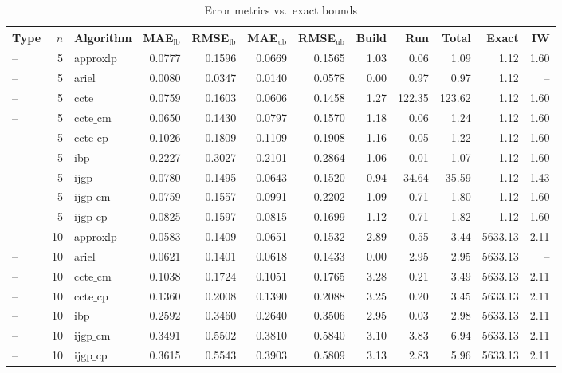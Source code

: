 \begin{table}[ht]
\centering
\scriptsize
\caption{Error metrics vs.\ exact bounds}
\begin{tabular}{lrlrrrrrrrrr}
\toprule
Type & $n$ & Algorithm & MAE$_{\text{lb}}$ & RMSE$_{\text{lb}}$ & MAE$_{\text{ub}}$ & RMSE$_{\text{ub}}$ & Build & Run & Total & Exact & IW \\
\midrule
-- & 5 & approxlp & 0.0777 & 0.1596 & 0.0669 & 0.1565 & 1.03 & 0.06 & 1.09 & 1.12 & 1.60 \\
-- & 5 & ariel & 0.0080 & 0.0347 & 0.0140 & 0.0578 & 0.00 & 0.97 & 0.97 & 1.12 & -- \\
-- & 5 & ccte & 0.0759 & 0.1603 & 0.0606 & 0.1458 & 1.27 & 122.35 & 123.62 & 1.12 & 1.60 \\
-- & 5 & $\text{ccte\_cm}$ & 0.0650 & 0.1430 & 0.0797 & 0.1570 & 1.18 & 0.06 & 1.24 & 1.12 & 1.60 \\
-- & 5 & $\text{ccte\_cp}$ & 0.1026 & 0.1809 & 0.1109 & 0.1908 & 1.16 & 0.05 & 1.22 & 1.12 & 1.60 \\
-- & 5 & ibp & 0.2227 & 0.3027 & 0.2101 & 0.2864 & 1.06 & 0.01 & 1.07 & 1.12 & 1.60 \\
-- & 5 & ijgp & 0.0780 & 0.1495 & 0.0643 & 0.1520 & 0.94 & 34.64 & 35.59 & 1.12 & 1.43 \\
-- & 5 & $\text{ijgp\_cm}$ & 0.0759 & 0.1557 & 0.0991 & 0.2202 & 1.09 & 0.71 & 1.80 & 1.12 & 1.60 \\
-- & 5 & $\text{ijgp\_cp}$ & 0.0825 & 0.1597 & 0.0815 & 0.1699 & 1.12 & 0.71 & 1.82 & 1.12 & 1.60 \\
-- & 10 & approxlp & 0.0583 & 0.1409 & 0.0651 & 0.1532 & 2.89 & 0.55 & 3.44 & 5633.13 & 2.11 \\
-- & 10 & ariel & 0.0621 & 0.1401 & 0.0618 & 0.1433 & 0.00 & 2.95 & 2.95 & 5633.13 & -- \\
-- & 10 & $\text{ccte\_cm}$ & 0.1038 & 0.1724 & 0.1051 & 0.1765 & 3.28 & 0.21 & 3.49 & 5633.13 & 2.11 \\
-- & 10 & $\text{ccte\_cp}$ & 0.1360 & 0.2008 & 0.1390 & 0.2088 & 3.25 & 0.20 & 3.45 & 5633.13 & 2.11 \\
-- & 10 & ibp & 0.2592 & 0.3460 & 0.2640 & 0.3506 & 2.95 & 0.03 & 2.98 & 5633.13 & 2.11 \\
-- & 10 & $\text{ijgp\_cm}$ & 0.3491 & 0.5502 & 0.3810 & 0.5840 & 3.10 & 3.83 & 6.94 & 5633.13 & 2.11 \\
-- & 10 & $\text{ijgp\_cp}$ & 0.3615 & 0.5543 & 0.3903 & 0.5809 & 3.13 & 2.83 & 5.96 & 5633.13 & 2.11 \\
\bottomrule
\end{tabular}
\end{table}
